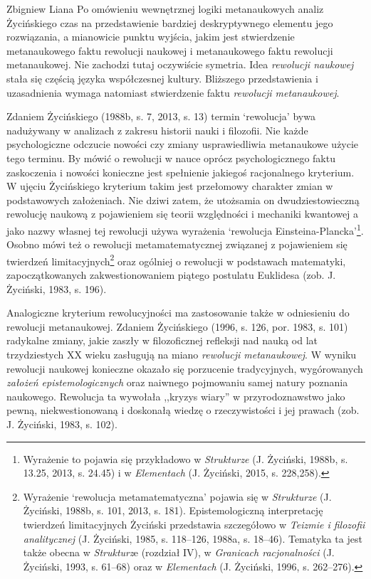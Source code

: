 \begin{artplenv}{Zbigniew Liana}
Po omówieniu wewnętrznej logiki metanaukowych analiz Życińskiego czas na przedstawienie bardziej deskryptywnego elementu
jego rozwiązania, a mianowicie punktu wyjścia, jakim jest stwierdzenie metanaukowego faktu rewolucji naukowej i metanaukowego
faktu rewolucji metanaukowej. Nie zachodzi tutaj oczywiście symetria. Idea \textit{rewolucji naukowej}
stała się częścią języka współczesnej kultury. Bliższego przedstawienia i uzasadnienia wymaga natomiast stwierdzenie
faktu \textit{rewolucji metanaukowej}. 

Zdaniem Życińskiego \label{ref:RNDm1e4fQpTDw}(1988b, s. 7, 2013, s. 13) termin `rewolucja' bywa nadużywany w analizach z zakresu
historii nauki i filozofii. Nie każde psychologiczne odczucie nowości czy zmiany usprawiedliwia metanaukowe
użycie tego terminu. By mówić o rewolucji w nauce oprócz psychologicznego faktu zaskoczenia i nowości konieczne jest
spełnienie jakiegoś racjonalnego kryterium. W ujęciu Życińskiego kryterium takim jest przełomowy charakter zmian w podstawowych
założeniach. Nie dziwi zatem, że utożsamia on dwudziestowieczną rewolucję naukową z pojawieniem się teorii
względności i mechaniki kwantowej a jako nazwy własnej tej rewolucji używa wyrażenia `rewolucja
Einsteina-Plancka'\footnote{Wyrażenie to pojawia się przykładowo w \textit{Strukturze} \label{ref:RNDnNQlvKNfJU}(J.
Życiński, 1988b, s. 13.25, 2013, s. 24.45) i w \textit{Elementach} \label{ref:RNDwUSTjxSagp}(J. Życiński, 2015,
s. 228,258).}. Osobno mówi też o rewolucji metamatematycznej związanej z pojawieniem się twierdzeń
limitacyjnych\footnote{Wyrażenie `rewolucja metamatematyczna' pojawia się w \textit{Strukturze }
\label{ref:RND06p9KBsVwr}(J. Życiński, 1988b, s. 101, 2013, s. 181). Epistemologiczną interpretację twierdzeń
limitacyjnych Życiński przedstawia szczegółowo w \textit{Teizmie i filozofii analitycznej} \label{ref:RNDromKVdEplH}(J.
Życiński, 1985, s. 118–126, 1988a, s. 18–46). Tematyka ta jest także obecna w \textit{Strukturz}e (rozdział IV), w \textit{Granicach
racjonalności} \label{ref:RNDVhjIsTMBSi}(J. Życiński, 1993, s. 61–68) oraz w \textit{Elementach}
\label{ref:RNDoBnYdXZe0T}(J. Życiński, 1996, s. 262–276).} oraz ogólniej o rewolucji w podstawach matematyki,
zapoczątkowanych zakwestionowaniem piątego postulatu Euklidesa \label{ref:RNDjSFh4bpxsh}(zob. J. Życiński, 1983, s. 196).

Analogiczne kryterium rewolucyjności ma zastosowanie także w odniesieniu do rewolucji metanaukowej. Zdaniem Życińskiego
\label{ref:RND9iw6GUDcsc}(1996, s. 126, por. 1983, s. 101) radykalne zmiany, jakie zaszły w filozoficznej refleksji nad
nauką od lat trzydziestych XX wieku zasługują na miano \textit{rewolucji metanaukowej}. W wyniku rewolucji naukowej
konieczne okazało się porzucenie tradycyjnych, wygórowanych \textit{założeń epistemologicznych} oraz naiwnego pojmowaniu
samej natury poznania naukowego. Rewolucja ta wywołała ,,kryzys wiary'' w przyrodoznawstwo jako pewną, niekwestionowaną i doskonałą
wiedzę o rzeczywistości i jej prawach \label{ref:RNDbGHN8nMTuu}(zob. J. Życiński, 1983, s. 102).


\end{artplenv}
